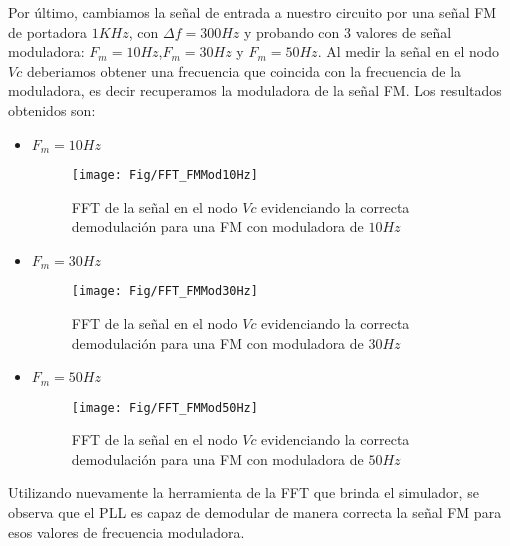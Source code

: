 \documentclass[10pt,a4paper]{IEEEtran}
\begin{document}
Por último, cambiamos la señal de entrada a nuestro circuito por una señal FM de portadora $1KHz$, con $\Delta f=300Hz$ y probando con 3 valores de señal 
moduladora: $F_m=10Hz$,$F_m=30Hz$ y $F_m=50Hz$. Al medir la señal en el nodo $Vc$ deberiamos obtener una frecuencia que coincida con la frecuencia de la moduladora, es decir 
recuperamos la moduladora de la señal FM. Los resultados obtenidos son:
\begin{itemize}
    \item $F_m=10Hz$
    \begin{figure}[H]
        \centering
        \texttt{[image: Fig/FFT\_FMMod10Hz]}
        \caption{FFT de la señal en el nodo $Vc$ evidenciando la correcta demodulación para una FM con moduladora de $10Hz$}
        \label{FM10}
    \end{figure}
    \item $F_m=30Hz$
    \begin{figure}[H]
        \centering
        \texttt{[image: Fig/FFT\_FMMod30Hz]}
        \caption{FFT de la señal en el nodo $Vc$ evidenciando la correcta demodulación para una FM con moduladora de $30Hz$}
        \label{FM30}
    \end{figure}
    \item $F_m=50Hz$
    \begin{figure}[H]
        \centering
        \texttt{[image: Fig/FFT\_FMMod50Hz]}
        \caption{FFT de la señal en el nodo $Vc$ evidenciando la correcta demodulación para una FM con moduladora de $50Hz$}
        \label{FM50}
    \end{figure}
\end{itemize}
Utilizando nuevamente la herramienta de la FFT que brinda el simulador, se observa que el PLL es capaz de demodular de manera 
correcta la señal FM para esos valores de frecuencia moduladora.








    
\end{document}
